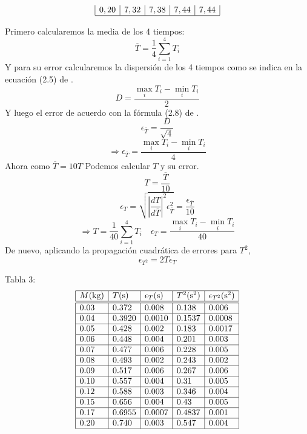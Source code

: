 \documentclass{article}
\begin{document}
\begin{multicols}{2}
\begin{center}
$$\begin{array}{|l|l|l|l|l|}
  0,20 & 7,32 & 7,38 & 7,44 & 7,44  \\ \hline
  \end{array}
$$
\end{center}
Primero calcularemos la media de los 4 tiempos:
$$
\overline{T} = \frac{1}{4}\sum_{i=1}^4 T_i
$$
Y para su error calcularemos la dispersión de los 4 tiempos como se indica en la ecuación (2.5) de \cite{manual}.
$$
D = \frac{\max_i T_i - \min_i T_i}{2}
$$
Y luego el error de acuerdo con la fórmula (2.8) de \cite{manual}.
$$
\epsilon_{\overline{T}} = \frac{D}{\sqrt{4}}
$$
$$
\Rightarrow
\epsilon_{\overline{T}} = \frac{\max_i T_i - \min_i T_i}{4}
$$
Ahora como $\overline{T} = 10 T$ Podemos calcular $T$ y su error.
$$
T = \frac{\overline{T}}{10}
$$
$$
\epsilon_T = \sqrt{\left| \frac{dT}{d\overline{T}} \right|^2 \epsilon_{\overline{T}}^2 } = \frac{\epsilon_{\overline{T}}}{10}
$$
$$
\Rightarrow
T = \frac{1}{40}\sum_{i=1}^4 T_i \quad \epsilon_{T} = \frac{\max_i T_i - \min_i T_i}{40}
$$
De nuevo, aplicando la propagación cuadrática de errores para $T^2$,
$$
\epsilon_{T^2} = 2T\epsilon_T
$$
\begin{center}
Tabla 3:  
$$
\begin{array}{|l|l|l|l|l|} \hline
  M\text{(kg)} & T\text{(s)} & \epsilon_T\text{(s)} & T^2\text{(s\textsuperscript{2})} & \epsilon_{T^2}\text{(s\textsuperscript{2})}\\ \hline \hline
  0.03 & 0.372 & 0.008 & 0.138 & 0.006  \\ \hline
  0.04 & 0.3920 & 0.0010 & 0.1537 & 0.0008  \\ \hline
  0.05 & 0.428 & 0.002 & 0.183 & 0.0017  \\ \hline
  0.06 & 0.448 & 0.004 & 0.201 & 0.003  \\ \hline
  0.07 & 0.477 & 0.006 & 0.228 & 0.005  \\ \hline
  0.08 & 0.493 & 0.002 & 0.243 & 0.002  \\ \hline
  0.09 & 0.517 & 0.006 & 0.267 & 0.006  \\ \hline
  0.10 & 0.557 & 0.004 & 0.31 & 0.005  \\ \hline
  0.12 & 0.588 & 0.003 & 0.346 & 0.004  \\ \hline
  0.15 & 0.656 & 0.004 & 0.43 & 0.005  \\ \hline
  0.17 & 0.6955 & 0.0007 & 0.4837 & 0.001  \\ \hline
  0.20 & 0.740 & 0.003 & 0.547 & 0.004  \\ \hline
  \end{array}
$$
\end{center}

\end{multicols}
\end{document}
